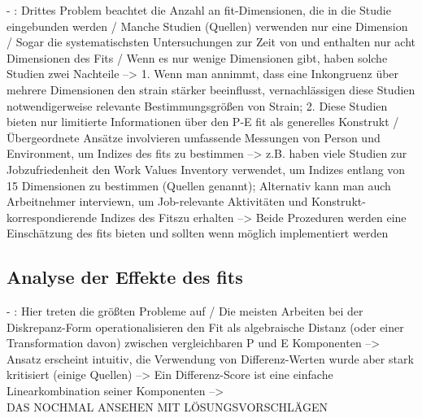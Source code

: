 - \cite[S. 8f.]{edwards:1990}: Drittes Problem beachtet die Anzahl an fit-Dimensionen, die in die Studie eingebunden werden / Manche Studien (Quellen) verwenden nur eine Dimension / Sogar die systematischsten Untersuchungen zur Zeit von \cite{copingAndAdaption:1974} und \cite{mechanismsOfJobStressAndStrain:1982} enthalten nur acht Dimensionen des Fits / Wenn es nur wenige Dimensionen gibt, haben solche Studien zwei Nachteile --> 1. Wenn man annimmt, dass eine Inkongruenz über mehrere Dimensionen den strain stärker beeinflusst, vernachlässigen diese Studien notwendigerweise relevante Bestimmungsgrößen von Strain; 2. Diese Studien bieten nur limitierte Informationen über den P-E fit als generelles Konstrukt / Übergeordnete Ansätze involvieren umfassende Messungen von Person und Environment, um Indizes des fits zu bestimmen --> z.B. haben viele Studien zur Jobzufriedenheit den Work Values Inventory verwendet, um Indizes entlang von 15 Dimensionen zu bestimmen (Quellen genannt); Alternativ kann man auch Arbeitnehmer interviewn, um Job-relevante Aktivitäten und Konstrukt-korrespondierende Indizes des Fitszu erhalten --> Beide Prozeduren werden eine Einschätzung des fits bieten und sollten wenn möglich implementiert werden

\subsection{Analyse der Effekte des fits}
\label{ch:notizen:methodischeProbleme:analyseDerEffekteDesFits}
- \cite[S. 9]{edwards:1990}: Hier treten die größten Probleme auf / Die meisten Arbeiten bei der Diskrepanz-Form operationalisieren den Fit als algebraische Distanz (oder einer Transformation davon) zwischen vergleichbaren P und E Komponenten --> Ansatz erscheint intuitiv, die Verwendung von Differenz-Werten wurde aber stark kritisiert (einige Quellen) --> Ein Differenz-Score ist eine einfache Linearkombination seiner Komponenten --> \\
DAS NOCHMAL ANSEHEN MIT LÖSUNGSVORSCHLÄGEN

